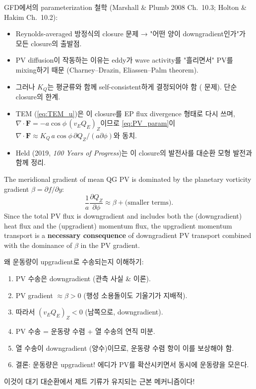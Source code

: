 \begin{hisublock}
GFD에서의 parameterization 철학 (Marshall \& Plumb 2008 Ch.~10.3; Holton \& Hakim Ch.~10.2):
\begin{itemize}
  \item Reynolds-averaged 방정식의 closure 문제 → "어떤 양이 downgradient인가"가
        모든 closure의 출발점.
  \item PV diffusion이 작동하는 이유는 eddy가 wave activity를 "흘리면서"
        PV를 mixing하기 때문 (Charney--Drazin, Eliassen--Palm theorem).
  \item 그러나 $K_Q$는 평균류와 함께 self-consistent하게 결정되어야 함
        ( 문제).  단순 closure의 한계.
  \item TEM (\eqref{eq:TEM_u})은 이 closure를 EP flux divergence 형태로 다시 쓰며,
        $\nabla\cdot\mathbf{F} = -a\cos\phi\,(v_E Q_E)_Z$이므로 \eqref{eq:PV_param}이
        $\nabla\cdot\mathbf{F} \approx K_Q\,a\cos\phi\,\partial Q_Z/(a\partial\phi)$와 동치.
  \item Held (2019, \emph{100 Years of Progress})는 이 closure의 발전사를
        대순환 모형 발전과 함께 정리.
\end{itemize}
\end{hisublock}

\begin{theorem}
The meridional gradient of mean QG PV is dominated by the planetary
vorticity gradient $\beta = \partial f/\partial y$:
\[
  \frac{1}{a}\frac{\partial Q_Z}{\partial\phi}
  \approx \beta + \text{(smaller terms)}.
\]
Since the total PV flux is downgradient and includes both the
(downgradient) heat flux and the (upgradient) momentum flux, the
upgradient momentum transport is a \textbf{necessary consequence} of
downgradient PV transport combined with the dominance of $\beta$ in
the PV gradient.
\end{theorem}

\begin{hisublock}
왜 운동량이 upgradient로 수송되는지 이해하기:
\begin{enumerate}
  \item PV 수송은 downgradient (관측 사실 \& 이론).
  \item PV gradient $\approx \beta > 0$ (행성 소용돌이도 기울기가 지배적).
  \item 따라서 $(v_E Q_E)_Z < 0$ (남쪽으로, downgradient).
  \item PV 수송 = 운동량 수렴 + 열 수송의 연직 미분.
  \item 열 수송이 downgradient (양수)이므로, 운동량 수렴 항이 이를 보상해야 함.
  \item 결론: 운동량은 upgradient! 에디가 PV를 확산시키면서 동시에 운동량을 모은다.
\end{enumerate}
이것이 대기 대순환에서 제트 기류가 유지되는 근본 메커니즘이다!
\end{hisublock}


